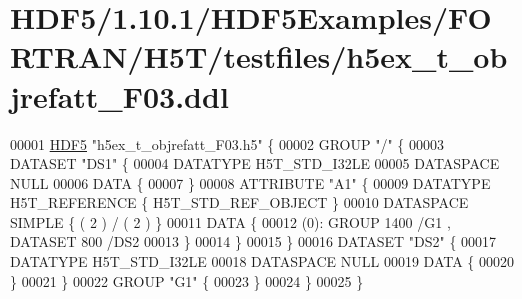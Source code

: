 \hypertarget{_h_d_f5_21_810_81_2_h_d_f5_examples_2_f_o_r_t_r_a_n_2_h5_t_2testfiles_2h5ex__t__objrefatt___f03_8ddl_source}{}\section{H\+D\+F5/1.10.1/\+H\+D\+F5\+Examples/\+F\+O\+R\+T\+R\+A\+N/\+H5\+T/testfiles/h5ex\+\_\+t\+\_\+objrefatt\+\_\+\+F03.ddl}
\label{_h_d_f5_21_810_81_2_h_d_f5_examples_2_f_o_r_t_r_a_n_2_h5_t_2testfiles_2h5ex__t__objrefatt___f03_8ddl_source}

\begin{DoxyCode}
00001 \hyperlink{namespace_h_d_f5}{HDF5} \textcolor{stringliteral}{"h5ex\_t\_objrefatt\_F03.h5"} \{
00002 GROUP \textcolor{stringliteral}{"/"} \{
00003    DATASET \textcolor{stringliteral}{"DS1"} \{
00004       DATATYPE  H5T\_STD\_I32LE
00005       DATASPACE  NULL
00006       DATA \{
00007       \}
00008       ATTRIBUTE \textcolor{stringliteral}{"A1"} \{
00009          DATATYPE  H5T\_REFERENCE \{ H5T\_STD\_REF\_OBJECT \}
00010          DATASPACE  SIMPLE \{ ( 2 ) / ( 2 ) \}
00011          DATA \{
00012          (0): GROUP 1400 /G1 , DATASET 800 /DS2 
00013          \}
00014       \}
00015    \}
00016    DATASET \textcolor{stringliteral}{"DS2"} \{
00017       DATATYPE  H5T\_STD\_I32LE
00018       DATASPACE  NULL
00019       DATA \{
00020       \}
00021    \}
00022    GROUP \textcolor{stringliteral}{"G1"} \{
00023    \}
00024 \}
00025 \}
\end{DoxyCode}
